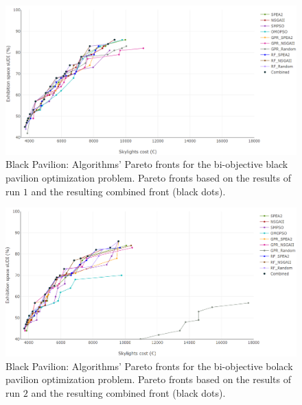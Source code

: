 \begin{figure}[h!]
	\centering
	\includegraphics[width=\textwidth]{Images/Evaluation/BlackPavilion/All_Algorithms_run1-2019-04-19.png}
	\caption[Black Pavilion: Pareto Fronts for run 1]{Black Pavilion: Algorithms' Pareto fronts for the bi-objective black pavilion optimization problem. Pareto fronts based on the results of run $1$ and the resulting combined front (black dots).}
	\label{table:blackpavilionrun1}
\end{figure}

\begin{figure}[h!]
	\centering
	\includegraphics[width=\textwidth]{Images/Evaluation/BlackPavilion/All_Algorithms_run2-2019-04-19.png}
	\caption[Black Pavilion: Pareto Fronts for run 2]{Black Pavilion: Algorithms' Pareto fronts for the bi-objective bolack pavilion optimization problem. Pareto fronts based on the results of run $2$ and the resulting combined front (black dots).}
	\label{table:blackpavilionrun2}
\end{figure}

